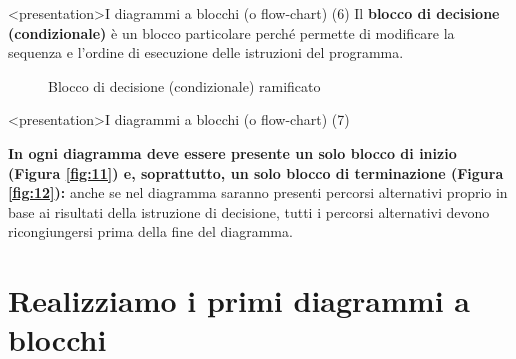 \documentclass[
    notheorems,
    11pt,
    compress,
    aspectratio=169
]{beamer}
\begin{document}
\begin{frame}<presentation>{I diagrammi a blocchi (o flow-chart) (6)}
    Il \textbf{blocco di decisione (condizionale)} è un blocco particolare perché permette di modificare la sequenza e l'ordine di esecuzione delle istruzioni del programma.

    \vspace{\baselineskip}

    \begin{figure}
        \centering

        
        \caption{Blocco di decisione (condizionale) ramificato}
        \label{fig:16}
    \end{figure}
\end{frame}

\begin{frame}<presentation>{I diagrammi a blocchi (o flow-chart) (7)}
    \begin{block}{}
        \textbf{In ogni diagramma deve essere presente un solo blocco di inizio (Figura \ref{fig:11}) e, soprattutto, un solo blocco di terminazione (Figura \ref{fig:12}):} anche se nel diagramma saranno presenti percorsi alternativi proprio in base ai risultati della istruzione di decisione, tutti i percorsi alternativi devono ricongiungersi prima della fine del diagramma.
    \end{block}
\end{frame}


\section{Realizziamo i primi diagrammi a blocchi}
\end{document}
